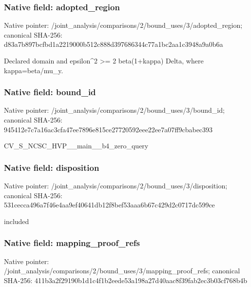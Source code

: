 \documentclass[10pt,a4paper]{article}
\begin{document}
\subsubsection{Native field: adopted\_\allowbreak{}region}
Native pointer: /joint\_\allowbreak{}analysis/comparisons/2/bound\_\allowbreak{}uses/3/adopted\_\allowbreak{}region; canonical SHA-256: d83a7b897bcfbd1a2219000b512c888d397686344c77a1bc2aa1c3948a9a0b6a

\begingroup\raggedright\sloppy Declared domain and epsilon\textasciicircum{}2 >=\allowbreak{} 2 beta(1+kappa) Delta,\allowbreak{} where kappa=\allowbreak{}beta/\allowbreak{}mu\_\allowbreak{}y.\par\endgroup

\subsubsection{Native field: bound\_\allowbreak{}id}
Native pointer: /joint\_\allowbreak{}analysis/comparisons/2/bound\_\allowbreak{}uses/3/bound\_\allowbreak{}id; canonical SHA-256: 945412e7c7a16ac3cfa47ee7896e815ce27720592eee22ee7a07ff9cbabec393

\begingroup\raggedright\sloppy CV\_\allowbreak{}S\_\allowbreak{}NCSC\_\allowbreak{}HVP\_\allowbreak{}\_\allowbreak{}main\_\allowbreak{}\_\allowbreak{}b4\_\allowbreak{}zero\_\allowbreak{}query\par\endgroup

\subsubsection{Native field: disposition}
Native pointer: /joint\_\allowbreak{}analysis/comparisons/2/bound\_\allowbreak{}uses/3/disposition; canonical SHA-256: 531cecca496a7f46e4aa9ef40641db12f8bef53aaa6b67c429d2c0717dc599ce

\begingroup\raggedright\sloppy included\par\endgroup

\subsubsection{Native field: mapping\_\allowbreak{}proof\_\allowbreak{}refs}
Native pointer: /joint\_\allowbreak{}analysis/comparisons/2/bound\_\allowbreak{}uses/3/mapping\_\allowbreak{}proof\_\allowbreak{}refs; canonical SHA-256: 411b3a2f29190b1d1c4f1b2eede53a198a27d40aac8f39fab2ec3b03cf768b4b
\end{document}
